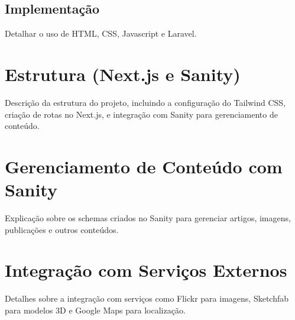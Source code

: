 \subsection{Implementação}
Detalhar o uso de HTML, CSS, Javascript e Laravel.

    \section{Estrutura (Next.js e Sanity)}
    \label{sec:desenvolvimento_site}
Descrição da estrutura do projeto, incluindo a configuração do Tailwind CSS, criação de rotas no Next.js, e integração com Sanity para gerenciamento de conteúdo.

\section{Gerenciamento de Conteúdo com Sanity}
\label{sec:gerenciamento_conteudo}
Explicação sobre os schemas criados no Sanity para gerenciar artigos, imagens, publicações e outros conteúdos.

\section{Integração com Serviços Externos}
\label{sec:integracao_servicos}
Detalhes sobre a integração com serviços como Flickr para imagens, Sketchfab para modelos 3D e Google Maps para localização.
